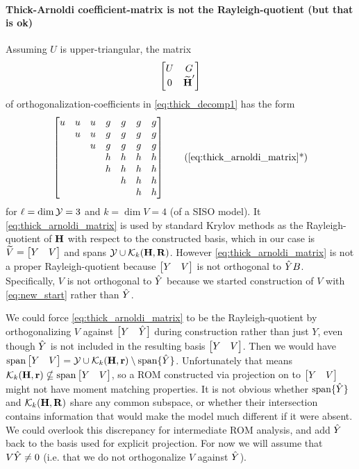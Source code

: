 \paragraph{Thick-Arnoldi coefficient-matrix is not the Rayleigh-quotient (but that is ok)}
Assuming $U$ is upper-triangular, the matrix 
\begin{equation}
\begin{bmatrix} U & G \\ 0&\widetilde{\textbf{\textup{H}}}^\prime\end{bmatrix}
\label{eq:thick_arnoldi_matrix}
\end{equation}
of orthogonalization-coefficients in \eqref{eq:thick_decomp1} has the form 
\begin{equation}
\mat{u&u&u&g&g&g&g\\%
        &u&u&g&g&g&g\\
	  &&u&g&g&g&g\\
	 &&&h&h&h&h\\
	 &&&h&h&h&h\\
	 &&&&h&h&h\\
	&&&&&h&h
}
\tag{\ref{eq:thick_arnoldi_matrix}*}
\end{equation}
for $\ell = \dim \mathcal{Y} = 3$ and $k=\dim V =4$ (of a SISO model). It \eqref{eq:thick_arnoldi_matrix}
 is used by standard Krylov methods as the Rayleigh-quotient of $\textbf{\textup{H}}$ with respect to the constructed basis, which in our case is $\widetilde{V}=\begin{bmatrix} Y&V\end{bmatrix}$ and spans $\mathcal{Y}\cup\mathcal{K}_{k}({\textbf{\textup{H}}},{\textbf{\textup{R}}})$.   However \eqref{eq:thick_arnoldi_matrix} is not a proper Rayleigh-quotient because $\begin{bmatrix} Y&V\end{bmatrix}$ is not orthogonal to $\hat{Y} B$.  Specifically, $V$ is not orthogonal to $\hat{Y}$ because we started construction of $V$ with \eqref{eq:new_start} rather than $\hat{Y}$. 


We could force \eqref{eq:thick_arnoldi_matrix} to be the Rayleigh-quotient by orthogonalizing $V$  against $\begin{bmatrix} Y&\hat{Y}\end{bmatrix}$ during construction  rather than just $Y$, even though $\hat{Y}$ is not included in the resulting basis $\begin{bmatrix} Y&V\end{bmatrix}$.  Then we would have $\operatorname*{span} \begin{bmatrix} Y&V\end{bmatrix} =\mathcal{Y} \cup \mathcal{K}_{k}({\textbf{\textup{H}}},{\textbf{\textup{r}}})\setminus \operatorname*{span}\{\hat{Y}\}$.  Unfortunately that means $\mathcal{K}_{k}({\textbf{\textup{H}}},{\textbf{\textup{r}}}) \nsubseteq \operatorname*{span} \begin{bmatrix} Y&V\end{bmatrix}$, so a ROM constructed via projection on to $\begin{bmatrix} Y&V\end{bmatrix}$ might not have moment matching properties.  It is not obvious whether $\operatorname*{span}\{\hat{Y}\}$ and $\mathcal{K}_{k}({\textbf{\textup{H}}},{\textbf{\textup{R}}})$  share any common subspace, or whether their intersection contains information that would make the model much different if it were absent.  We could overlook this discrepancy for intermediate ROM analysis, and add $\hat{Y}$ back to the basis used for explicit projection.   For now we will assume that $V\hat{Y}\neq 0$ (i.e. that we do not orthogonalize $V$ against $\hat{Y}$).





